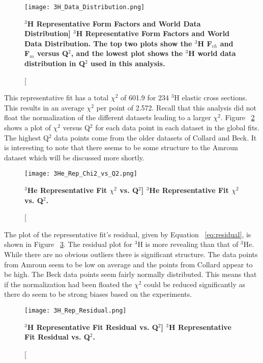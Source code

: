 \begin{figure}[!ht]
	\begin{center}
	\texttt{[image: 3H\_Data\_Distribution.png]}
	\end{center}
	\caption[\bf{$^3$H Representative Form Factors and World Data Distribution}]{
	{\bf{$^3$H Representative Form Factors and World Data Distribution.}} The top two plots show the $^3$H F$_{ch}$ and F$_m$ versus Q$^2$, and the lowest plot shows the $^3$H world data distribution in Q$^2$ used in this analysis.}
	\label{fig:3h_data_distribution}
\end{figure}

This representative fit has a total $\chi^2$ of 601.9 for 234 $^3$H elastic cross sections. This results in an average $\chi^2$ per point of 2.572. Recall that this analysis did not float the normalization of the different datasets leading to a larger $\chi^2$. Figure ~\ref{fig:3h_rep_fit_chi2_q2} shows a plot of $\chi^2$ versus Q$^2$ for each data point in each dataset in the global fits. The highest Q$^2$ data points come from the older datasets of Collard and Beck. It is interesting to note that there seems to be some structure to the Amroun dataset which will be discussed more shortly. 

\begin{figure}[!ht]
	\begin{center}
	\texttt{[image: 3He\_Rep\_Chi2\_vs\_Q2.png]}
	\end{center}
	\caption[\bf{$^3$He Representative Fit $\chi^2$ vs. Q$^2$}]{
	{\bf{$^3$He Representative Fit $\chi^2$ vs. Q$^2$.}} }
	\label{fig:3h_rep_fit_chi2_q2}
\end{figure}

The plot of the representative fit's residual, given by Equation ~\ref{eq:residual}, is shown in Figure ~\ref{fig:3h_rep_fit_residual}. The residual plot for $^3$H is more revealing than that of $^3$He. While there are no obvious outliers there is significant structure. The data points from Amroun seem to be low on average and the points from Collard appear to be high. The Beck data points seem fairly normally distributed. This means that if the normalization had been floated the $\chi^2$ could be reduced significantly as there do seem to be strong biases based on the experiments. 

\begin{figure}[!ht]
	\begin{center}
	\texttt{[image: 3H\_Rep\_Residual.png]}
	\end{center}
	\caption[\bf{$^3$H Representative Fit Residual vs. Q$^2$}]{
	{\bf{$^3$H Representative Fit Residual vs. Q$^2$.}} }
	\label{fig:3h_rep_fit_residual}
\end{figure}

